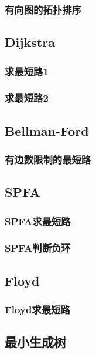 \documentclass[10pt,a4paper]{article}
\begin{document}
\subsubsection{有向图的拓扑排序}

\subsection{Dijkstra}
\subsubsection{求最短路1}

\subsubsection{求最短路2}

\subsection{Bellman-Ford}
\subsubsection{有边数限制的最短路}

\subsection{SPFA}
\subsubsection{SPFA求最短路}

\subsubsection{SPFA判断负环}

\subsection{Floyd}
\subsubsection{Floyd求最短路}

\subsection{最小生成树}
\end{document}
